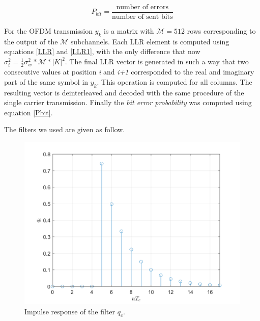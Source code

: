 \documentclass[a4paper, 12pt]{report}
\begin{document}
\begin{equation}\label{Pbit}
P_{bit} = \frac{\text{number of errors}}{\text{number of sent bits}}
\end{equation}

For the OFDM transmission $y_k$ is a matrix with $\mathcal{M}=512$ rows corresponding to the output of the $\mathcal{M}$ subchannels. Each LLR element is computed using equations \ref{LLR} and \ref{LLR1}, with the only difference that now $\sigma_i^2 = \frac{1}{2}\sigma_w^2*\mathcal{M}*|K|^2 $. The final LLR vector is generated in such a way that two consecutive values at position \textit{i} and \textit{i+1} corresponded to the real and imaginary part of the same symbol in $y_k$. This operation is computed for all columns. The resulting vector is deinterleaved and decoded with the same procedure of the single carrier transmission. Finally the \textit{bit error probability} was computed using equation \ref{Pbit}.

\clearpage
The filters we used are given as follow.

\begin{figure}[H]
	\centering
	\includegraphics[width=14cm]{qc}
	\caption{Impulse response of the filter $q_c$.}
\end{figure}
\end{document}
